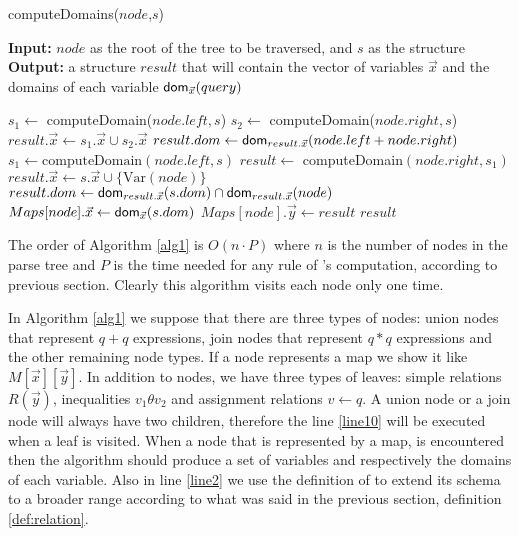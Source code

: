 \documentclass[12pt]{article}
\begin{document}
\begin{algorithm}[H]
\caption{computeDomains($node$,$s$)} 
\label{alg1}
\textbf{Input:} $node$ as the root of the tree to be traversed, and $s$ as the structure \\
\textbf{Output:} a structure $result$ that will contain the vector of variables $\vec x$ and the domains of each variable $\textsf{dom}{}_{\vec x}(query)$
\begin{algorithmic}[1]
\STATE  $s_{1}\gets$ computeDomain($node$.$left, s$)
\STATE  $s_{2}\gets$ computeDomain($node.right, s$)
\STATE  $result.\vec{x}\gets s_{1}.\vec{x} \cup s_{2}.\vec{x}$ 
\STATE  $result.dom\gets \text{\textsf{dom}}_{result.\vec x}(node.left + node.right)$
\label{line:join1}
\STATE  $s_{1} \gets \text{computeDomain}(node.left, s)$
\label{line:join2}
\STATE $result\gets$ computeDomain$(node.right, s_{1})$
\ELSE 
\label{line10}
\STATE $result.\vec{x}\gets s.\vec{x} \cup \{\text{Var$(node)$}\}$
\STATE $result.dom\gets \text{\textsf{dom}}_{result.\vec{x}}(s.dom)\cap\text{\textsf{dom}}_{result.\vec{x}}(node)$\label{line2}
\ENDIF
{}
\STATE $Maps[node].\vec{x}\gets\text{\textsf{dom}}_{\vec{x}}(s.dom)$
\STATE $Maps[node].\vec{y}\gets result$
\ENDIF
\RETURN $result$
\end{algorithmic}
\end{algorithm}
The order of Algorithm \ref{alg1} is $O(n\cdot P)$ where $n$ is the number of nodes in the parse tree and $P$ is the time needed for any rule of \dom{}'s computation, according to previous section. Clearly this algorithm visits each node only one time. \par

In Algorithm \ref{alg1} we suppose that there are three types of nodes: union nodes that represent $q+q$ expressions, join nodes that represent $q*q$ expressions and the other remaining node types. If a node represents a map we show it like $M[\vec x][\vec y]$. In addition to nodes, we have three types of leaves: simple relations $R(\vec y)$, inequalities $v_{1}\theta v_{2}$ and assignment relations $v \gets q$. A union node or a join node will always have two children, therefore the line \ref{line10} will be executed when a leaf is visited. When a node that is represented by a map, is encountered then the algorithm should produce a set of variables and respectively the domains of each variable. Also in line \ref{line2} we use the definition of \dom{} to extend its schema to a broader range according to what was said in the previous section, definition \eqref{def:relation}. \\\par
\end{document}
